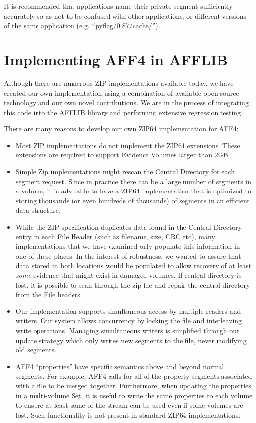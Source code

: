 \documentclass[10pt, conference]{IEEEtran}
\begin{document}
It is recommended that applications name their private segment
sufficiently accurately so as not to be confused with other
applications, or different versions of the same application
(e.g. ``pyflag/0.87/cache/'').



\section{Implementing AFF4 in AFFLIB}
Although there are numerous ZIP implementations available
today, we have created our own implementation using a combination of
available open source technology and our own novel contributions. We
are in the process of integrating this code into the AFFLIB library
and performing extensive regression testing. 

There are many reasons to develop our own ZIP64 implementation for
AFF4:

\begin{itemize}
\item Most ZIP implementations do not implement the ZIP64
  extensions. These extensions are required to support Evidence
  Volumes larger than 2GB.
\item Simple Zip implementations might rescan the
Central Directory for each segment request. Since in practice there
can be a large number of segments in a volume, it is advisable to have
a ZIP64 implementation that is optimized to storing thousands (or even
hundreds of thousands) of segments in an efficient data structure. 
\item While the ZIP specification duplicates data found in the Central
  Directory entry in each File Header (such as filename, size, CRC
  etc), many implementations that we have examined only populate this
  information in one of these places. In the interest of robustness,
  we wanted to assure that data stored in both locations would be
  populated to allow recovery of at least \emph{some} evidence that
  might exist in damaged volumes. If central directory is lost, it is
  possible to scan through the zip file and repair the central
  directory from the File headers.

\item Our implementation supports simultaneous access by multiple
  readers and writers. Our system allows concurrency by locking the
  file and interleaving write operations. Managing simultaneous
  writers is simplified through our update strategy which only writes
  new segments to the file, never modifying old segments. 
\item AFF4 ``properties'' have specific semantics above and beyond
  normal segments. For example, AFF4 calls for all of the property
  segments associated with a file to be merged together. Furthermore,
  when updating the properties in a multi-volume Set, it is useful to
  write the same properties to each volume to ensure at least some of
the stream can be used even if some volumes are lost. Such
functionality is not present in standard ZIP64 implementations.
\end{itemize}
\end{document}
